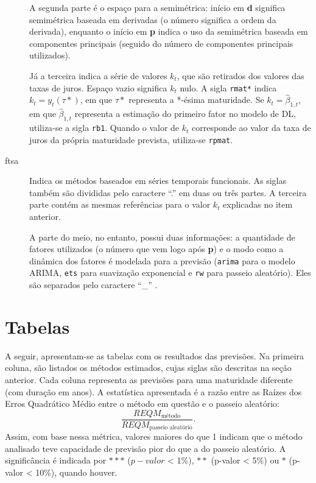 \documentclass[
	12pt,				%
	openright,			%
	oneside,			%
	a4paper,			%
	english,			%
	brazil				%
	]{dissertacao-ufrgs-abntex2}
\begin{document}
\begin{apendicesenv}
\begin{description}
	A segunda parte é o espaço para a semimétrica: início em \textbf{d} significa semimétrica baseada em derivadas (o número significa a ordem da derivada), enquanto o início em \textbf{p} indica o uso da semimétrica baseada em componentes principais (seguido do número de componentes principais utilizados). 
	
	Já a terceira indica a série de valores $k_t$, que são retirados dos valores das taxas de juros. Espaço vazio significa $k_t$ nulo. A sigla \texttt{rmat*} indica $k_t = y_t(\tau*)$, em que $\tau*$ representa a *-ésima maturidade. Se $k_t = \hat{\beta}_{1,t}$, em que $\hat{\beta}_{1,t}$ representa a estimação do primeiro fator no modelo de DL, utiliza-se a sigla \texttt{rb1}. Quando o valor de $k_t$ corresponde ao valor da taxa de juros da própria maturidade prevista, utiliza-se \texttt{rpmat}.

	\item[ftsa] Indica os métodos baseados em séries temporais funcionais. As siglas também são divididas pelo caractere ``.'' em duas ou três partes. A terceira parte contém as mesmas referências para o valor $k_t$ explicadas no item anterior.
	
A parte do meio, no entanto, possui duas informações: a quantidade de fatores utilizados (o número que vem logo após \textbf{p}) e o modo como a dinâmica dos fatores é modelada para a previsão (\texttt{arima} para o modelo ARIMA, \texttt{ets} para suavização exponencial e \texttt{rw} para passeio aleatório). Eles são separados pelo caractere ``\_'' .

\end{description}

\section{Tabelas} \label{apend:tabelas}

A seguir, apresentam-se as tabelas com os resultados das previsões. Na primeira coluna, são listados os métodos estimados, cujas siglas são descritas na seção anterior. Cada coluna representa as previsões para uma maturidade diferente (com duração em anos). A estatística apresentada é a razão entre as Raízes dos Erros Quadrático Médio entre o método em questão e o passeio aleatório:
\[
\dfrac{REQM_{\text{método}}}{REQM_{\text{passeio aleatório}}}.
\]
Assim, com base nessa métrica, valores maiores do que 1 indicam que o método analisado teve capacidade de previsão pior do que a do passeio aleatório. A significância é indicada por $***$ ($p-valor$ < 1\%), $**$ (p-valor < 5\%) ou $*$ (p-valor < 10\%), quando houver.


\end{apendicesenv}

\end{document}

